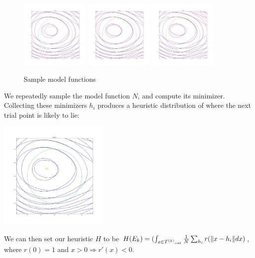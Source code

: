 \documentclass{article}
\begin{document}
\begin{figure}[h]
    \centering
    \includegraphics[width=125px]{images/other_polynomial_2.png}
    \includegraphics[width=125px]{images/other_polynomial_3.png}
    \includegraphics[width=125px]{images/other_polynomial_5.png}
    \caption{Sample model functions}
    \label{smf}
\end{figure}

We repeatedly sample the model function $N$, and compute its minimizer.
Collecting these minimizers $h_i$ produces a heuristic distribution of where the next trial point is likely to lie:

\begin{center}
\includegraphics[width=200px]{images/sampled_minimums.png}
\end{center}

We can then set our heuristic $H$ to be $H(E_k) = (\int_{x\in {T^{(k)}}_{\text{out}}} \frac 1 N \sum_{h_i}r(\|x - h_i\| dx)$,
where $r(0) = 1$ and $x>0 \Rightarrow r'(x) < 0$.
\end{document}
